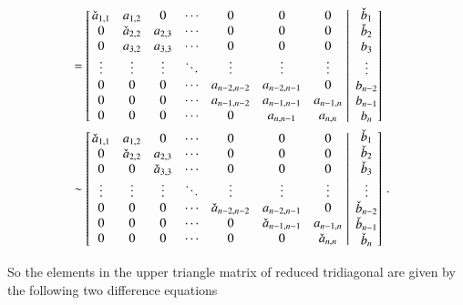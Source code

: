 \documentclass[11pt,english,a4paper]{article}
\begin{document}
\begin{flushleft}
\begin{align*}
\\
&=  \left[{\left.\begin{matrix} \check a_{1,1} & a_{1,2} & 0 & \cdots & 0 & 0 & 0 \\ 0 &  \check a_{2,2} & a_{2,3} & \cdots & 0 & 0 & 0\\ 0 & a_{3,2} & a_{3,3} & \cdots & 0 & 0 & 0\\ \vdots & \vdots & \vdots  & \ddots & \vdots & \vdots & \vdots \\ 0 & 0 & 0 & \cdots & a_{n-2,n-2} & a_{n-2,n-1} & 0 \\ 0 & 0 & 0 & \cdots & a_{n-1,n-2} & a_{n-1,n-1} & a_{n-1,n} \\ 0 & 0 & 0 &\cdots & 0 & a_{n,n-1} & a_{n,n} \end{matrix}\,\,\right\vert\,\,\begin{matrix} \check b_1 \\ \check b_2\\ b_3 \\ \vdots \\ b_{n-2} \\ b_{n-1} \\ b_n\end{matrix}}\right]
\\
&\sim  \left[{\left.\begin{matrix} \check a_{1,1} & a_{1,2} & 0 & \cdots & 0 & 0 & 0 \\ 0 &  \check a_{2,2} & a_{2,3} & \cdots & 0 & 0 & 0\\ 0 & 0 & \check a_{3,3} & \cdots & 0 & 0 & 0\\ \vdots & \vdots & \vdots  & \ddots & \vdots & \vdots & \vdots \\ 0 & 0 & 0 & \cdots & \check a_{n-2,n-2} & a_{n-2,n-1} & 0 \\ 0 & 0 & 0 & \cdots & 0 & \check a_{n-1,n-1} & a_{n-1,n} \\ 0 & 0 & 0 &\cdots & 0 & 0 & \check a_{n,n} \end{matrix}\,\,\right\vert\,\,\begin{matrix} \check b_1 \\ \check b_2\\ \check b_3 \\ \vdots \\ \check b_{n-2} \\ \check b_{n-1} \\ \check b_n\end{matrix}}\right] \,.
\end{align*}

So the elements in the upper triangle matrix of reduced tridiagonal are given by the following two difference equations


\end{flushleft}
\end{document}
